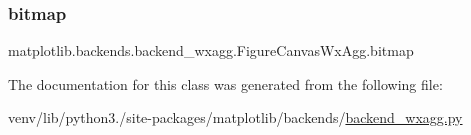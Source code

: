 \subsubsection{\texorpdfstring{bitmap}{bitmap}}
{\footnotesize\ttfamily matplotlib.\+backends.\+backend\+\_\+wxagg.\+Figure\+Canvas\+Wx\+Agg.\+bitmap}



The documentation for this class was generated from the following file\+:\begin{DoxyCompactItemize}
\item 
venv/lib/python3./site-\/packages/matplotlib/backends/\hyperlink{backend__wxagg_8py}{backend\+\_\+wxagg.\+py}\end{DoxyCompactItemize}
